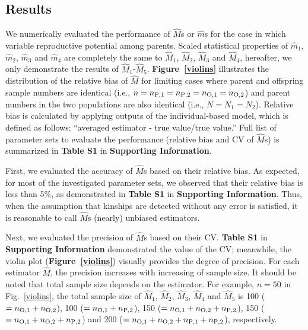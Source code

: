 \documentclass[12pt, English]{article}
\begin{document}
\begin{spacing}{1.9}
\section{Results}\label{sec3}

We numerically evaluated the performance of ${\hat M}$s or ${\hat m}$s for the case in which variable reproductive potential among parents. Scaled statistical properties of ${\hat m_1}$,  ${\hat m_2}$,  ${\hat m_3}$ and ${\hat m_4}$ are completely the same to ${\hat M_1}$, ${\hat M_2}$, ${\hat M_3}$ and ${\hat M_4}$, hereafter, we only demonstrate the results of ${\hat M_1}$-${\hat M_5}$. {\bf Figure~\ref{violins}} illustrates the distribution of the relative bias of ${\hat M}$ for limiting cases where parent and offspring sample numbers are identical (i.e., $n=n_{\rm P,1}=n_{\rm P,2}=n_{\rm O,1}= n_{\rm O,2}$) and parent numbers in the two populations are also identical (i.e., $N=N_1=N_2$). Relative bias is calculated by applying outputs of the individual-based model, which is defined as follows: ``averaged estimator - true value/true value.'' Full list of parameter sets to evaluate the performance (relative bias and CV of ${\hat M}$s) is summarized in {\bf Table S1} in {\bf Supporting Information}. 
 
\begin{center}
\end{center}

First, we evaluated the accuracy of ${\hat M}$s based on their relative bias. As expected, for most of the investigated parameter sets, we observed that their relative bias is less than 5\%, as demonstrated in {\bf Table S1} in {\bf Supporting Information}. Thus, when the assumption that kinships are detected without any error is satisfied, it is reasonable to call ${\hat M}$s (nearly) unbiased estimators. 

Next, we evaluated the precision of ${\hat M}$s based on their CV. {\bf Table S1} in {\bf Supporting Information} demonstrated the value of the CV; meanwhile, the violin plot ({\bf Figure~\ref{violins}}) visually provides the degree of precision. For each estimator ${\hat M}$, the precision increases with increasing of sample size. It should be noted that total sample size depends on the estimator. For example, $n=50$ in Fig.~\ref{violins}, the total sample size of ${\hat M_1}$, ${\hat M_2}$, ${\hat M_3}$, ${\hat M_4}$ and ${\hat M_5}$ is 100 ($=n_{\rm O,1}+n_{\rm O,2}$), 100 ($=n_{\rm O,1}+n_{\rm P,2}$), 150 ($=n_{\rm O,1}+n_{\rm O,2}+n_{\rm P,2}$), 150 ($=n_{\rm O,1}+n_{\rm O,2}+n_{\rm P,2}$) and 200 ($=n_{\rm O,1}+n_{\rm O,2}+n_{\rm P,1}+n_{\rm P,2}$), respectively. 


\end{spacing}
\end{document}
